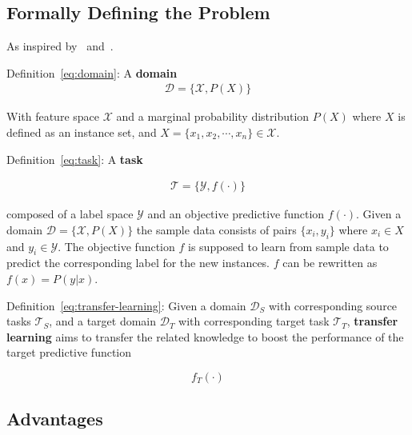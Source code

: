 \documentclass[11pt]{article}
\begin{document}
\subsection{Formally Defining the Problem}

As inspired by~\cite{concise-review-of-transfer-learning} and~\cite{survey-on-transfer-learning}.

Definition~\ref{eq:domain}: A \textbf{domain} \begin{align}
    \mathcal{D} = \{\mathcal{X}, P(X)\}
   \label{eq:domain}
\end{align}

With feature space $\mathcal{X}$ and a marginal probability distribution $P(X)$ where $X$ is defined as an instance set, and $X = \{x_1, x_2, \cdots, x_n\} \in \mathcal{X}$.

\vspace{1em}

Definition~\ref{eq:task}: A \textbf{task}

\begin{align}
    \mathcal{T} = \{\mathcal{Y}, f(\cdot)\}
   \label{eq:task}
\end{align}

composed of a label space $\mathcal{Y}$ and an objective predictive function $f(\cdot)$. Given a domain $\mathcal{D} = \{\mathcal{X}, P(X)\}$ the sample data consists of pairs $\{x_i, y_i\}$ where $x_i \in X$ and $y_i \in \mathcal{Y}$. The objective function $f$ is supposed to learn from sample data to predict the corresponding label for the new instances. $f$ can be rewritten as $f(x)=P(y|x)$.

\vspace{1em}

Definition~\ref{eq:transfer-learning}: Given a domain $\mathcal{D}_S$ with corresponding source tasks $\mathcal{T}_S$, and a target domain $\mathcal{D}_T$ with corresponding target task $\mathcal{T}_T$, \textbf{transfer learning} aims to transfer the related knowledge to boost the performance of the target predictive function

\begin{equation}
    f_T(\cdot)
   \label{eq:transfer-learning}
\end{equation}

\subsection{Advantages}
\end{document}
